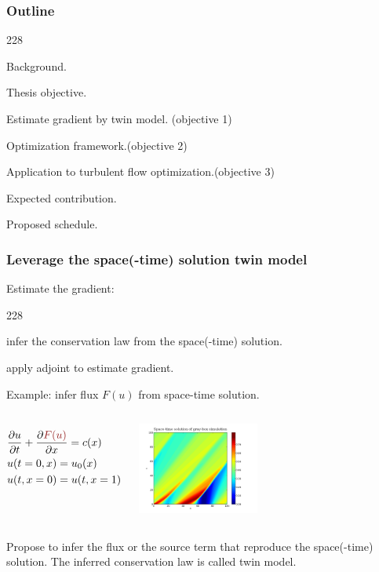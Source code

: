 \documentclass{beamer}
\newcommand{\barrow}{\item[\color{darkred}\ding{228}]}
\begin{document}
\begin{frame}
    \frametitle{Outline}\small
    \begin{dinglist}{228}
        \barrow {} Background.
        \barrow Thesis objective.
        \vspace{.35cm}
        \barrow Estimate gradient by twin model. \hfill        (objective 1)
        \barrow {}
                Optimization framework.\hfill(objective 2)
        \barrow Application to turbulent flow optimization.\hfill(objective 3)\\
        \vspace{.35cm}
        \barrow Expected contribution.
        \barrow Proposed schedule.
    \end{dinglist}
\end{frame}



\begin{frame}
    \frametitle{Leverage the space(-time) solution \hfill \scriptsize{twin model}}\small
    Estimate the gradient:
    \begin{dinglist}{228}
        \barrow infer the conservation law from the space(-time) solution.
        \barrow apply adjoint to estimate gradient.
    \end{dinglist}
    \vspace{.2cm}

    Example: infer flux $F(u)$ from space-time solution.
    \begin{columns}
        \begin{equation*}\begin{split}
            &\frac{\partial u}{\partial t}+ \frac{\partial \textcolor{darkred}{F(u)}}{\partial x} = c(x)\\
            &u(t=0,x) = u_0(x)\\
            &u(t,x=0) = u(t, x=1)
        \end{split}\end{equation*}
        \begin{center}
            \includegraphics[width=4cm]{black_sol.png}
        \end{center}
    \end{columns}
    \vspace{.15cm}
    Propose to infer the flux or the source term that reproduce the space(-time) solution. The inferred
    conservation law is called twin model.
\end{frame}
\end{document}
